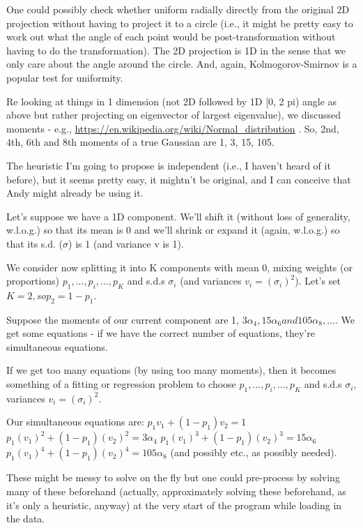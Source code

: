 \documentclass{elsarticle}
\begin{document}
One could possibly check whether uniform radially directly from the
original 2D projection without having to project it to a circle (i.e., it
might be pretty easy to work out what the angle of each point would
be post-transformation without having to do the transformation).  The
2D projection is 1D in the sense that we only care about the angle
around the circle.  And, again, Kolmogorov-Smirnov is a popular test
for uniformity.

Re looking at things in 1 dimension (not 2D followed by 1D [0, 2 pi) angle
as above but rather projecting on eigenvector of largest eigenvalue), we
discussed moments - e.g., \url{https://en.wikipedia.org/wiki/Normal_distribution} .
So, 2nd, 4th, 6th and 8th moments of a true Gaussian are 1, 3, 15, 105.

The heuristic I'm going to propose is independent (i.e., I haven't heard
of it before), but it seems pretty easy, it mightn't be original, and I can
conceive that Andy might already be using it.

Let's suppose we have a 1D component.  We'll shift it (without loss of
generality, w.l.o.g.) so that its mean is 0 and we'll shrink or expand it
(again, w.l.o.g.) so that its s.d. ($\sigma$) is 1 (and variance v is 1).

We consider now splitting it into K components with mean 0,
mixing weights (or proportions) $p_1, ..., p_i, ..., p_K$ and s.d.s $\sigma_i$ (and variances $v_i = (\sigma_i)^2$).
Let's set $K = 2, so p_2 = 1 - p_1$.

Suppose the moments of our current component are 1, $3 \alpha_4, 15 \alpha_6 and 105 \alpha_8, ... $.
We get some equations - if we have the correct number of equations,
they're simultaneous equations.

If we get too many equations (by using too many moments), then it
becomes something of a fitting or regression problem to choose
$p_1, ..., p_i, ..., p_K$ and s.d.s $\sigma_i$, variances $v_i = (\sigma_i)^2$.

Our simultaneous equations are:
$p_1 v_1       + (1 - p_1) v_2       =    1$
$p_1 (v_1)^2  + (1 - p_1) (v_2)^2  =    3 \alpha_4$
$p_1 (v_1)^3  + (1 - p_1) (v_2)^3  =   15 \alpha_6$
$p_1 (v_1)^4  + (1 - p_1) (v_2)^4  =  105 \alpha_8$
(and possibly etc., as possibly needed).

These might be messy to solve on the fly  but
one could pre-process by solving many of these beforehand
(actually, approximately solving these beforehand, as it's only
a heuristic, anyway) at the very start of the program while
loading in the data.
\end{document}

